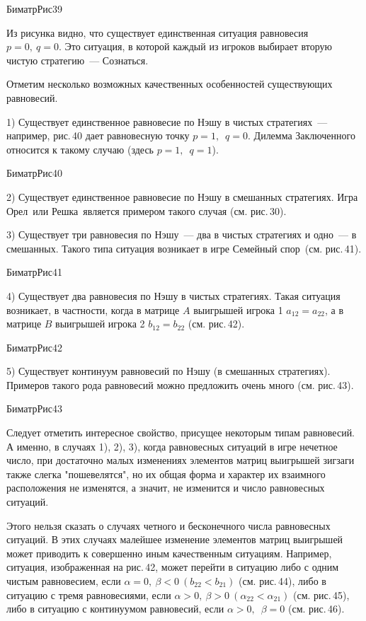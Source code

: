 БиматрРис39


Из рисунка видно, что
существует единственная ситуация равновесия $p=0,~q=0$.  Это
ситуация, в которой каждый из игроков выбирает вторую чистую
стратегию~--- Сознаться.

Отметим несколько возможных качественных особенностей существующих
равновесий.

1) Существует единственное равновесие по Нэшу в чистых стратегиях~---
например, рис.\,40 дает равновесную точку $p=1,$\, $q=0.$ Дилемма
Заключенного\, относится к такому случаю (здесь $p=1,$\, $q=1$).


БиматрРис40


2) Существует единственное равновесие по Нэшу в смешанных стратегиях.
Игра Орел\, или Решка\, является примером такого случая (см. рис.\,30).

3) Существует три равновесия по Нэшу~--- два в чистых стратегиях и одно~--- в
смешанных.  Такого типа ситуация возникает в игре Семейный спор\,
(см. рис.\,41).


БиматрРис41



4) Существует два равновесия по Нэшу в чистых стратегиях.
Такая ситуация возникает, в частности, когда в матрице $A$
выигрышей игрока 1 $a_{12}=a_{22}$,
а в матрице $B $ выигрышей игрока 2 $ b_{12}=b_{22}$ (см. рис.\,42).


БиматрРис42


5) Существует континуум равновесий по Нэшу (в смешанных стратегиях).
Примеров такого рода равновесий можно предложить очень много
(см.  рис.\,43).


БиматрРис43



Следует отметить интересное свойство,
присущее некоторым типам равновесий.  А именно, в случаях 1), 2), 3),
когда равновесных ситуаций в игре  нечетное число, при достаточно
малых изменениях элементов матриц выигрышей зигзаги также слегка
"пошевелятся", но их общая форма и характер их взаимного расположения
не изменятся, а значит, не изменится и число равновесных ситуаций.

Этого нельзя сказать о случаях четного и бесконечного числа
равновесных ситуаций. В этих случаях малейшее изменение элементов
матриц выигрышей может приводить к совершенно иным качественным
ситуациям. Например, ситуация, изображенная на рис.\,42,  может
перейти в ситуацию либо с одним чистым равновесием, если $\alpha
=0,~\beta <0~(b_{22}<b_{21})$ (см. рис.\,44), либо в ситуацию с
тремя равновесиями, если $\alpha >0,~\beta >0~(\alpha _{22}<\alpha
_{21})$ (см. рис.\,45), либо в ситуацию с континуумом равновесий,
если $\alpha >0,$\, $\beta =0 $ (см. рис.\,46).


